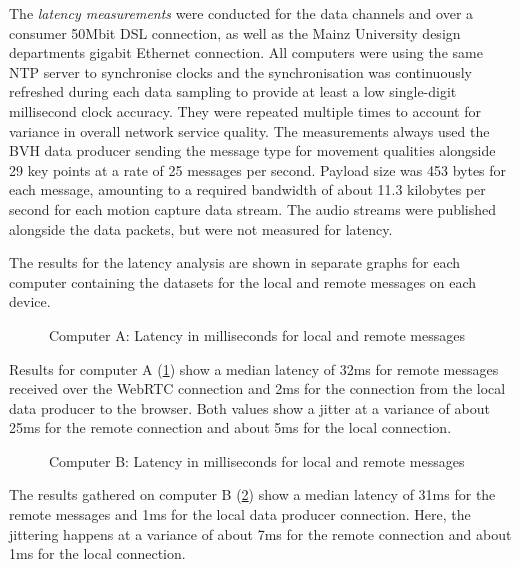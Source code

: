 The \emph{latency measurements} were conducted for the data channels and over a consumer 50Mbit \ac{DSL} connection, as well as the Mainz University design department\textquotesingle s gigabit Ethernet connection.
All computers were using the same \ac{NTP} server to synchronise clocks and the synchronisation was continuously refreshed during each data sampling to provide at least a low single-digit millisecond clock accuracy.
They were repeated multiple times to account for variance in overall network service quality.
The measurements always used the \ac{BVH} data producer sending the message type for movement qualities alongside 29 key points at a rate of 25 messages per second.
Payload size was 453 bytes for each message, amounting to a required bandwidth of about 11.3 kilobytes per second for each motion capture data stream.
The audio streams were published alongside the data packets, but were not measured for latency.

The results for the latency analysis are shown in separate graphs for each computer containing the datasets for the local and remote messages on each device.

\begin{figure}[h]
\centering

\caption[Message latency on Computer A]{Computer A: Latency in milliseconds for local and remote messages\protect}
\label{fig:latencyComputerA}
\end{figure}

Results for computer A (\ref{fig:latencyComputerA}) show a median latency of 32ms for remote messages received over the WebRTC connection and 2ms for the connection from the local data producer to the browser.
Both values show a jitter at a variance of about 25ms for the remote connection and about 5ms for the local connection.

\begin{figure}[h]
\centering

\caption[Message latency on Computer B]{Computer B: Latency in milliseconds for local and remote messages\protect}
\label{fig:latencyComputerB}
\end{figure}

The results gathered on computer B (\ref{fig:latencyComputerB}) show a median latency of 31ms for the remote messages and 1ms for the local data producer connection.
Here, the jittering happens at a variance of about 7ms for the remote connection and about 1ms for the local connection.

